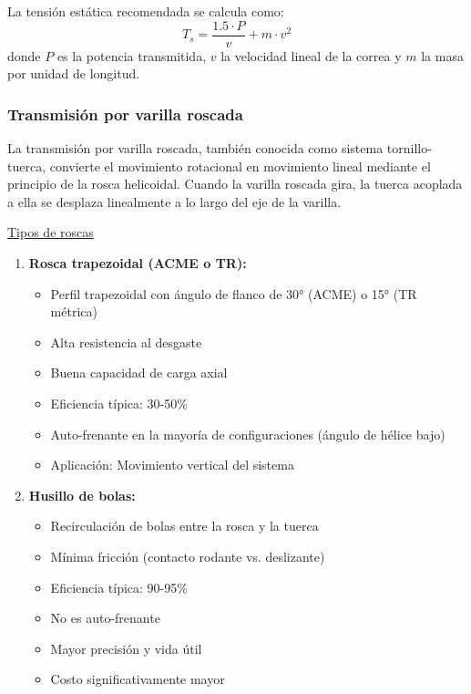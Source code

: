 La tensión estática recomendada se calcula como:
\begin{equation}
    T_s = \frac{1.5 \cdot P}{v} + m \cdot v^2
\end{equation}
donde $P$ es la potencia transmitida, $v$ la velocidad lineal de la correa y $m$ la masa por unidad de longitud.

\subsubsection{Transmisión por varilla roscada}

La transmisión por varilla roscada, también conocida como sistema tornillo-tuerca, convierte el movimiento rotacional en movimiento lineal mediante el principio de la rosca helicoidal. Cuando la varilla roscada gira, la tuerca acoplada a ella se desplaza linealmente a lo largo del eje de la varilla.

\underline{Tipos de roscas}
\begin{enumerate}
    \item \textbf{Rosca trapezoidal (ACME o TR):}
    \begin{itemize}[label=$\bullet$]
        \item Perfil trapezoidal con ángulo de flanco de 30° (ACME) o 15° (TR métrica)
        \item Alta resistencia al desgaste
        \item Buena capacidad de carga axial
        \item Eficiencia típica: 30-50\%
        \item Auto-frenante en la mayoría de configuraciones (ángulo de hélice bajo)
        \item Aplicación: Movimiento vertical del sistema
    \end{itemize}

    \item \textbf{Husillo de bolas:}
    \begin{itemize}[label=$\bullet$]
        \item Recirculación de bolas entre la rosca y la tuerca
        \item Mínima fricción (contacto rodante vs. deslizante)
        \item Eficiencia típica: 90-95\%
        \item No es auto-frenante
        \item Mayor precisión y vida útil
        \item Costo significativamente mayor
    \end{itemize}
\end{enumerate}

